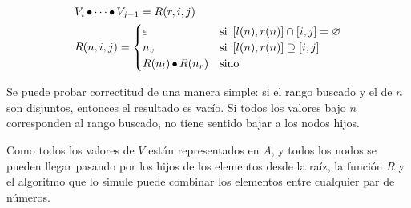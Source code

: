 \[
\begin{split}
	& V_i \operatorname{\bullet} \cdots \operatorname{\bullet} V_{j - 1} = R(r, i, j) \\
	& R(n, i, j) =
	\begin{cases}
		\mathbf{\varepsilon} &\text{si } \left[l(n), r(n)\right] \cap \left[i, j\right] = \varnothing \\
		n_v &\text{si } \left[l(n), r(n)\right] \supseteq \left[i, j\right] \\
		R(n_l) \operatorname{\bullet} R(n_r) &\text{sino}
	\end{cases}
\end{split}
\]

Se puede probar correctitud de una manera simple: si el rango buscado y el de \(n\) son disjuntos, entonces el resultado es vacío. Si todos los valores bajo \(n\) corresponden al rango buscado, no tiene sentido bajar a los nodos hijos.

Como todos los valores de \(V\) están representados en \(A\), y todos los nodos se pueden llegar pasando por los hijos de los elementos desde la raíz, la función \(R\) y el algoritmo que lo simule puede combinar los elementos entre cualquier par de números.

% 
% 
